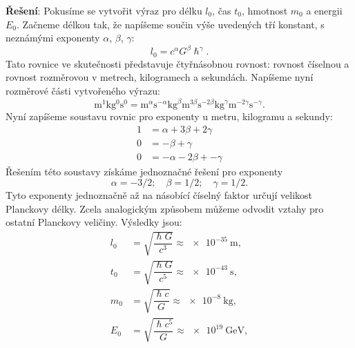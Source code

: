 \begin{mdframed}[style=mdexam]
\begin{example}
    \textbf{Řešení}: Pokusíme se vytvořit výraz pro délku \(l_0\), čas \(t_0\), hmotnost \(m_0\) a
    energii \(E_0\). Začneme délkou tak, že napíšeme součin výše uvedených tří konstant, s neznámými
    exponenty \(α\), \(β\), \(γ\): 
    \begin{equation*}
      l_0 = c^αG^β\hslash^γ.
    \end{equation*}
    Tato rovnice ve skutečnosti představuje čtyřnásobnou rovnost: rovnost číselnou a rovnost
    rozměrovou v metrech, kilogramech a sekundách. Napíšeme nyní rozměrové části vytvořeného výrazu:
    \begin{equation*}
      \mathrm{m^1kg^0s^0} = \si{\m}^α\si{\s}^{-α}                   %
                            \si{\kg}^{β}\si{\m}^{3β}\si{\s}^{-2β}   %
                            \si{\kg}^γ\si{\m}^{-2γ}\si{\s}^{-γ}.     %
    \end{equation*}
    Nyní zapíšeme soustavu rovnic pro exponenty u metru, kilogramu a sekundy:
    \begin{align*}
      1 &=   α + 3β + 2γ    \\
      0 &=     -  β +  γ    \\
      0 &= - α - 2β + -γ    
    \end{align*}
    Řešením této soustavy získáme jednoznačné řešení pro exponenty
    \begin{equation*}
      α =−3/2;\quad β=1/2;\quad γ=1/2. 
    \end{equation*}
    Tyto exponenty jednoznačně až na násobící číselný faktor určují velikost Planckovy délky. Zcela
    analogickým způsobem můžeme odvodit vztahy pro ostatní Planckovy veličiny. Výsledky jsou:
    \begin{subequations}\label{fyz:eq751} 
      \begin{align}
        l_0&=\sqrt{\dfrac{\hslash G}{c^3}}\approx \SI{e-35}{\m},               \label{fyz:eq751a}\\
        t_0&=\sqrt{\dfrac{\hslash G}{c^5}}\approx \SI{e-43}{\s},               \label{fyz:eq751b}\\
        m_0&=\sqrt{\dfrac{\hslash c}{G}}  \approx \SI{e-8}{\kg},               \label{fyz:eq751c}\\
        E_0&=\sqrt{\dfrac{\hslash c^5}{G}}\approx \SI{e19}{\giga\electronvolt},\label{fyz:eq751d}
      \end{align}
    \end{subequations} 
  \end{example}
\end{mdframed}